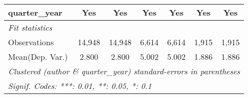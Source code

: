 \begin{tabular}{lcccccc}
   quarter\_year                         & Yes           & Yes           & Yes           & Yes           & Yes          & Yes\\  
   \midrule
   \emph{Fit statistics}\\
   Observations                          & 14,948        & 14,948        & 6,614         & 6,614         & 1,915        & 1,915\\  
Mean(Dep. Var.) & 2.800 & 2.800 & 5.002 & 5.002 & 1.886 & 1.886 \\
   \midrule \midrule
   \multicolumn{7}{l}{\emph{Clustered (author \& quarter\_year) standard-errors in parentheses}}\\
   \multicolumn{7}{l}{\emph{Signif. Codes: ***: 0.01, **: 0.05, *: 0.1}}\\
\end{tabular}
\par\endgroup
